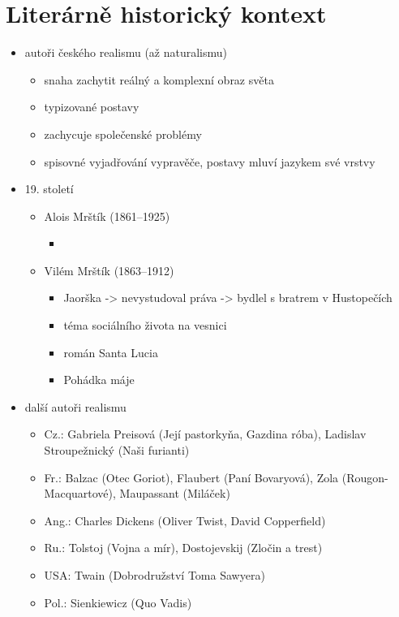 \documentclass[10pt,a4paper]{article}
\begin{document}
\section*{Literárně historický kontext}
\begin{itemize}
\item autoři českého realismu (až naturalismu)
	\begin{itemize}
	\item snaha zachytit reálný a komplexní obraz světa
	\item typizované postavy
	\item zachycuje společenské problémy
	\item spisovné vyjadřování vypravěče, postavy mluví jazykem své vrstvy
	\end{itemize}
\item 19. století 
	\begin{itemize}
	\item Alois Mrštík (1861--1925)	
		\begin{itemize}
		\item 
		\end{itemize}
	\item Vilém Mrštík (1863--1912)
		\begin{itemize}
		\item Jaorška -> nevystudoval práva -> bydlel s bratrem v Hustopečích
		\item téma sociálního života na vesnici
		\item román Santa Lucia
		\item Pohádka máje
		\end{itemize}
	\end{itemize}
\item další autoři realismu
	\begin{itemize}
	\item Cz.: Gabriela Preisová (Její pastorkyňa, Gazdina róba), Ladislav Stroupežnický (Naši furianti)
	\item Fr.: Balzac (Otec Goriot), Flaubert (Paní Bovaryová), Zola (Rougon-Macquartové), Maupassant (Miláček)
	\item Ang.: Charles Dickens (Oliver Twist, David Copperfield)
	\item Ru.: Tolstoj (Vojna a mír), Dostojevskij (Zločin a trest)
	\item USA: Twain (Dobrodružství Toma Sawyera)
	\item Pol.: Sienkiewicz (Quo Vadis)
	\end{itemize}
\end{itemize}
\end{document}
